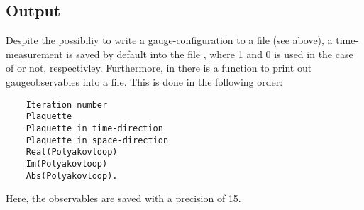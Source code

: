\subsection{Output}

Despite the possibiliy to write a gauge-configuration to a file (see above), a time-measurement is saved by default into the file , where 1 and 0 is used in the case of  or not, respectivley. Furthermore, in  there is a function to print out gaugeobservables into a file. This is done in the following order:

\begin{verbatim}
	Iteration number
	Plaquette
	Plaquette in time-direction
	Plaquette in space-direction
	Real(Polyakovloop)
	Im(Polyakovloop)
	Abs(Polyakovloop).
\end{verbatim}
Here, the observables are saved with a precision of 15.


